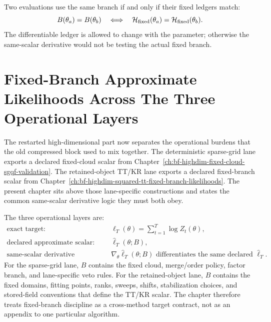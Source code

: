 Two evaluations use the same branch if and only if their fixed ledgers match:
\begin{equation}
  B(\theta_a)=B(\theta_b)
  \quad\Longleftrightarrow\quad
  \mathcal H_{\rm fixed}(\theta_a)=\mathcal H_{\rm fixed}(\theta_b).
  \label{eq:bf-hd-branch-equality}
\end{equation}
The differentiable ledger is allowed to change with the parameter; otherwise the
same-scalar derivative would not be testing the actual fixed branch.

\section[Fixed-branch approximate likelihoods]{Fixed-Branch Approximate Likelihoods Across The Three Operational Layers}
\label{sec:bf-hd-fixed-branch-likelihoods}

The restarted high-dimensional part now separates the operational burdens that
the old compressed block used to mix together.  The deterministic sparse-grid
lane exports a declared fixed-cloud scalar from
Chapter~\ref{ch:bf-highdim-fixed-cloud-sgqf-validation}.  The retained-object
TT/KR lane exports a declared fixed-branch scalar from
Chapter~\ref{ch:bf-highdim-squared-tt-fixed-branch-likelihoods}.  The present
chapter sits above those lane-specific constructions and states the common
same-scalar derivative logic they must both obey.

The three operational layers are:
\begin{equation}
\begin{aligned}
  \text{exact target:}&\quad \ell_T(\theta)=\sum_{t=1}^T\log Z_t(\theta),\\
  \text{declared approximate scalar:}&\quad \widehat\ell_T(\theta;B),\\
  \text{same-scalar derivative requirement:}&\quad
  \nabla_\theta \widehat\ell_T(\theta;B)
  \text{ differentiates the same declared } \widehat\ell_T.
\end{aligned}
  \label{eq:bf-hd-fixed-branch-three-layer}
\end{equation}
For the sparse-grid lane, \(B\) contains the fixed cloud, merge/order policy,
factor branch, and lane-specific veto rules.  For the retained-object lane,
\(B\) contains the fixed domains, fitting points, ranks, sweeps, shifts,
stabilization choices, and stored-field conventions that define the TT/KR scalar.
The chapter therefore treats fixed-branch discipline as a cross-method target
contract, not as an appendix to one particular algorithm.

